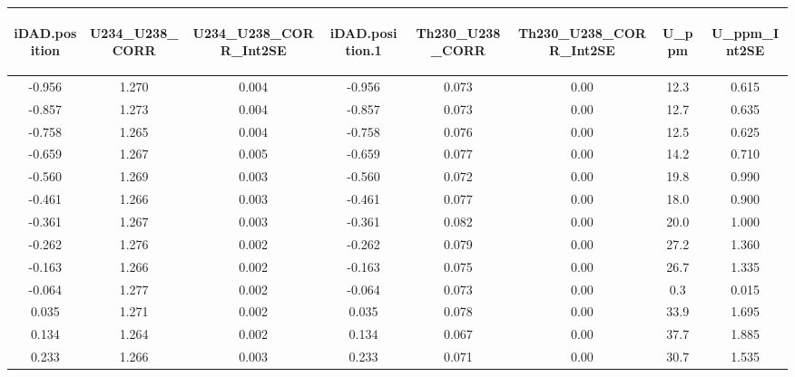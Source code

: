\documentclass[]{elsarticle} %
\begin{document}
\begin{table}[ht]
\centering
\begin{tabular}{cccccccc}
  \hline
\begin{sideways} iDAD.position \end{sideways} & \begin{sideways} U234\_U238\_CORR \end{sideways} & \begin{sideways} U234\_U238\_CORR\_Int2SE \end{sideways} & \begin{sideways} iDAD.position.1 \end{sideways} & \begin{sideways} Th230\_U238\_CORR \end{sideways} & \begin{sideways} Th230\_U238\_CORR\_Int2SE \end{sideways} & \begin{sideways} U\_ppm \end{sideways} & \begin{sideways} U\_ppm\_Int2SE \end{sideways} \\ 
  \hline
-0.956 & 1.270 & 0.004 & -0.956 & 0.073 & 0.00 & 12.3 & 0.615 \\ 
  -0.857 & 1.273 & 0.004 & -0.857 & 0.073 & 0.00 & 12.7 & 0.635 \\ 
  -0.758 & 1.265 & 0.004 & -0.758 & 0.076 & 0.00 & 12.5 & 0.625 \\ 
  -0.659 & 1.267 & 0.005 & -0.659 & 0.077 & 0.00 & 14.2 & 0.710 \\ 
  -0.560 & 1.269 & 0.003 & -0.560 & 0.072 & 0.00 & 19.8 & 0.990 \\ 
  -0.461 & 1.266 & 0.003 & -0.461 & 0.077 & 0.00 & 18.0 & 0.900 \\ 
  -0.361 & 1.267 & 0.003 & -0.361 & 0.082 & 0.00 & 20.0 & 1.000 \\ 
  -0.262 & 1.276 & 0.002 & -0.262 & 0.079 & 0.00 & 27.2 & 1.360 \\ 
  -0.163 & 1.266 & 0.002 & -0.163 & 0.075 & 0.00 & 26.7 & 1.335 \\ 
  -0.064 & 1.277 & 0.002 & -0.064 & 0.073 & 0.00 & 0.3 & 0.015 \\ 
  0.035 & 1.271 & 0.002 & 0.035 & 0.078 & 0.00 & 33.9 & 1.695 \\ 
  0.134 & 1.264 & 0.002 & 0.134 & 0.067 & 0.00 & 37.7 & 1.885 \\ 
  0.233 & 1.266 & 0.003 & 0.233 & 0.071 & 0.00 & 30.7 & 1.535 \\ 

\end{tabular}
\end{table}
\end{document}
